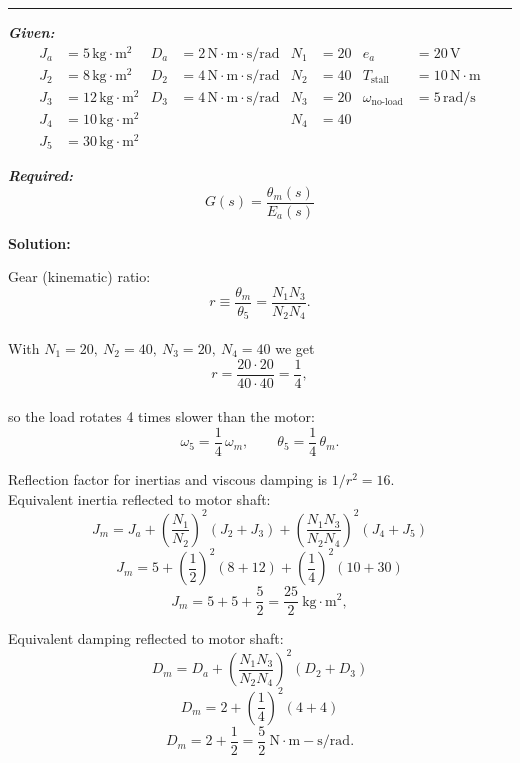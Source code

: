 ﻿\documentclass[11pt]{article}
\begin{document}
\noindent\rule{\textwidth}{1pt}

\vspace{12pt}

\noindent\textbf{\textit{Given:}}
\[
\begin{aligned}
J_a &= 5\, \text{kg}\cdot\text{m}^2 & D_a &= 2\, \text{N}\cdot\text{m}\cdot\text{s/rad} & N_1 &= 20 & e_a &= 20\,\text{V} \\
J_2 &= 8\, \text{kg}\cdot\text{m}^2 & D_2 &= 4\, \text{N}\cdot\text{m}\cdot\text{s/rad} & N_2 &= 40 & T_{\text{stall}} &= 10\,\text{N}\cdot\text{m} \\
J_3 &= 12\, \text{kg}\cdot\text{m}^2 & D_3 &= 4\, \text{N}\cdot\text{m}\cdot\text{s/rad} & N_3 &= 20 & \omega_{\text{no-load}} &= 5\,\text{rad/s} \\
J_4 &= 10\, \text{kg}\cdot\text{m}^2 & & & N_4 &= 40 & & \\
J_5 &= 30\, \text{kg}\cdot\text{m}^2 & & & & & &
\end{aligned}
\]

\vspace{12pt}

\noindent\textbf{\textit{Required:}}
\[
G(s) = \frac{\theta_m(s)}{E_a(s)}
\]

\vspace{12pt}

\noindent \textbf{Solution:}

Gear (kinematic) ratio:
\[
r \equiv \frac{\theta_m}{\theta_5}=\frac{N_1 N_3}{N_2 N_4}.
\]  \\

With \(N_1=20,\ N_2=40,\ N_3=20,\ N_4=40\) we get
\[
r=\frac{20 \cdot 20}{40 \cdot 40}=\frac{1}{4},
\] \\

so the load rotates 4 times slower than the motor:
\[
\omega_5 = \frac{1}{4}\,\omega_m,\qquad \theta_5 = \frac{1}{4}\,\theta_m.
\]

Reflection factor for inertias and viscous damping is \(1/r^2 = 16\). \\

Equivalent inertia reflected to motor shaft:
\[
J_m = J_a + \left(\frac{N_1}{N_2}\right)^2 (J_2 + J_3) + \left(\frac{N_1 N_3}{N_2 N_4}\right)^2 (J_4 + J_5)
\]
\[
J_m = 5 + \left(\frac{1}{2}\right)^2 (8 + 12) + \left(\frac{1}{4}\right)^2 (10 + 30)
\]
\[
J_m = 5 + 5 + \frac{5}{2} = \frac{25}{2}\ \mathrm{kg\cdot m^2},
\]

Equivalent damping reflected to motor shaft:
\[
D_m = D_a + \left(\frac{N_1 N_3}{N_2 N_4}\right)^2 (D_2 + D_3)
\]
\[
D_m = 2 + \left(\frac{1}{4}\right)^2 (4 + 4)
\]
\[
D_m = 2 + \frac{1}{2} = \frac{5}{2}\ \mathrm{N\cdot m\!-\!s/rad}.
\]
\end{document}
